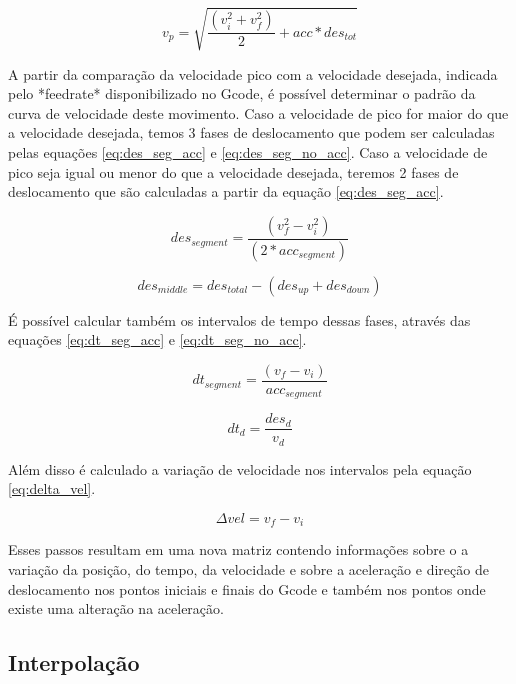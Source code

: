 \begin{equation}
    \label{eq:v_p}
    v_p = \sqrt{\frac{(v_i^2+v_f^2)}{2}+acc*des_{tot}}
\end{equation}

A partir da comparação da velocidade pico com a velocidade desejada, indicada pelo *feedrate* disponibilizado no Gcode,
é possível determinar o padrão da curva de velocidade deste movimento.
Caso a velocidade de pico for maior do que a velocidade desejada, temos 3 fases de deslocamento
que podem ser calculadas pelas equações \ref{eq:des_seg_acc} e \ref{eq:des_seg_no_acc}.
Caso a velocidade de pico seja igual ou menor do que a velocidade desejada, teremos 2 fases de deslocamento
que são calculadas a partir da equação \ref{eq:des_seg_acc}.

\begin{equation}
    \label{eq:des_seg_acc}
    des_{segment} = \frac{(v_f^2-v_i^2)}{(2*acc_{segment})}
\end{equation}

\begin{equation}
    \label{eq:des_seg_no_acc}
    des_{middle} = des_{total}-(des_{up}+des_{down})
\end{equation}

É possível calcular também os intervalos de tempo dessas fases, através das 
equações \ref{eq:dt_seg_acc} e \ref{eq:dt_seg_no_acc}.

\begin{equation}
    \label{eq:dt_seg_acc}
    dt_{segment} = \frac{(v_f-v_i)}{acc_{segment}}
\end{equation}

\begin{equation}
    \label{eq:dt_seg_no_acc}
    dt_d = \frac{des_d}{v_d}
\end{equation}

Além disso é calculado a variação de velocidade nos intervalos pela equação \ref{eq:delta_vel}.

\begin{equation}
    \label{eq:delta_vel}
    \Delta vel = v_f-v_i
\end{equation}

Esses passos resultam em uma nova matriz contendo informações
sobre o a variação da posição, do tempo, da velocidade e sobre a aceleração e 
direção de deslocamento nos pontos iniciais e finais do Gcode e também nos pontos
onde existe uma alteração na aceleração.

\subsection{Interpolação}

